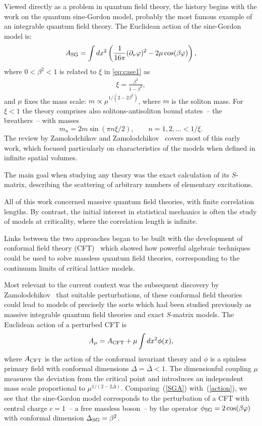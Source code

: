 \documentclass[pdftex]{sigma}
\numberwithin{equation}{section}
\theoremstyle{definition}
\begin{document}
Viewed directly as a problem in quantum f\/ield theory, the history  begins with the work on the quantum
sine-Gordon model, probably the most famous example of an integrable quantum f\/ield
theory. The Euclidean action of the   sine-Gordon model  is:
\begin{gather}
\label{SGA}
A_{\rm SG} = \int dx^2 \left(\frac{1}{16 \pi} (\partial_{\nu} \varphi)^2 -  2 \mu \cos(\beta \varphi) \right),
\end{gather}
where $0<\beta^2<1$ is related to $\xi$ in \eqref{eq:case1} as
\begin{gather}
\label{eq:xi}
\xi= \frac{\beta^2}{ 1 - \beta^2},
\end{gather}
and $\mu$ f\/ixes the mass scale:   $m \propto \mu^{1/(2-2 \beta^2)}$, where $m$ is the soliton mass.
For $\xi<1$  the theory comprises also solitons-antisoliton bound states~-- the breathers~-- with  masses
\[
m_n=2 m \sin(\pi n \xi/2),\qquad n=1,2,\ldots<1/\xi.
\]
The review by  Zamolodchikov and   Zamolodchikov~\cite{Zamolodchikov79} covers most
of this early work, which focused particularly on characteristics of the
models when def\/ined in inf\/inite spatial volumes.

The main goal when
studying any theory was the
exact calculation of its $S$-matrix, describing the scattering of
arbitrary numbers of elementary excitations.

All of this work concerned massive quantum f\/ield theories,
with f\/inite correlation lengths. By contrast, the initial interest in
statistical mechanics is often the study of models at criticality, where the
correlation length is inf\/inite.

Links between the two approaches began to be built with the
development of conformal f\/ield theory (CFT)~\cite{Belavin84} which showed how powerful
algebraic techniques could be used to solve massless quantum f\/ield
theories, corresponding to the continuum limits of critical lattice models.

Most relevant to the
current context was the subsequent discovery by Zamolodchikov~\cite{Zamolodchikov89}
that
suitable  perturbations, of these conformal f\/ield
theories could lead to models of precisely the sorts
which had been studied previously as massive integrable quantum f\/ield
theories and exact $S$-matrix models. The Euclidean action of a perturbed CFT is
\begin{gather}
A_{\mu}= A_{\rm CFT}+ \mu \int dx^2 \phi(x),
\label{action}
\end{gather}
where $A_{\rm CFT}$ is the action of the  conformal invariant theory and  $\phi$ is a
spinless   primary   f\/ield with conformal dimensions $\Delta=\bar{\Delta}<1$.
The dimensionful coupling $\mu$  measures the
deviation from the critical point and  introduces an independent mass scale
proportional to $\mu^{ 1/(2-2 \Delta)}$. Compa\-ring~(\ref{SGA}) with~(\ref{action}), we see that the sine-Gordon model corresponds
 to the perturbation of a CFT with  central charge $c=1$~-- a free massless boson~-- by  the operator  $\phi_{\rm SG}=2 \cos(\beta \varphi)$
 with conformal  dimension $\Delta_{\rm SG}=\beta^2$.
\end{document}
